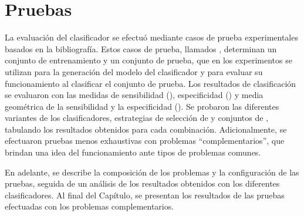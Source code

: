 %
%
%
%
\setcounter{chapter}{3}
%
\chapter{Pruebas}
%
La evaluación del clasificador se efectuó mediante casos de prueba
experimentales basados en la bibliografía.
Estos casos de prueba, llamados , determinan un conjunto
de entrenamiento y un conjunto de prueba, que en los experimentos se
utilizan para la generación del modelo del clasificador y para evaluar
su funcionamiento al clasificar el conjunto de prueba.
Los resultados de clasificación se evaluaron con las medidas de
sensibilidad (\SE), especificidad (\SP) y media geométrica de la
sensibilidad y la especificidad (\GM).
Se probaron las diferentes variantes de los clasificadores,
estrategias de selección de  y conjuntos de ,
tabulando los resultados obtenidos para cada combinación.
Adicionalmente, se efectuaron pruebas menos exhaustivas con problemas
``complementarios'', que brindan una idea del funcionamiento ante
tipos de problemas comunes.

En adelante, se describe la composición de los problemas y la
configuración de las pruebas, seguida de un análisis de los resultados
obtenidos con los diferentes clasificadores.
Al final del Capítulo, se presentan los resultados de las pruebas
efectuadas con los problemas complementarios.
